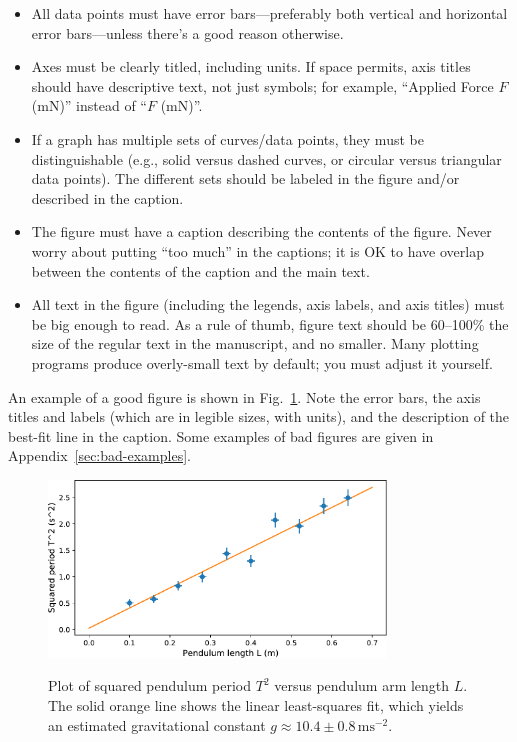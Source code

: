 \documentclass[11pt,a4paper]{article}
\begin{document}
\begin{itemize}
\item All data points must have error bars---preferably both vertical
  and horizontal error bars---unless there's a good reason otherwise.

\item Axes must be clearly titled, including units.  If space permits,
  axis titles should have descriptive text, not just symbols; for
  example, ``Applied Force $F$ (mN)'' instead of ``$F$ (mN)''.

\item If a graph has multiple sets of curves/data points, they must be
  distinguishable (e.g., solid versus dashed curves, or circular
  versus triangular data points).  The different sets should be
  labeled in the figure and/or described in the caption.

\item The figure must have a caption describing the contents of the
  figure.  Never worry about putting ``too much'' in the captions; it
  is OK to have overlap between the contents of the caption and the
  main text.

\item
  All text in the figure (including the legends, axis labels, and axis
  titles) must be big enough to read.  As a rule of thumb, figure text
  should be 60--100\% the size of the regular text in the manuscript,
  and no smaller.  Many plotting programs produce overly-small text by
  default; you must adjust it yourself.
\end{itemize}
\noindent
An example of a good figure is shown in Fig.~\ref{pendulum-figure-1}.
Note the error bars, the axis titles and labels (which are in legible
sizes, with units), and the description of the best-fit line in the
caption.  Some examples of bad figures are given in
Appendix~\ref{sec:bad-examples}.

\begin{figure}[h]
  \centering
  \includegraphics[width=0.8\textwidth]{pendulum-figure-1.pdf} \\
  \caption{\small Plot of squared pendulum period $T^2$ versus
    pendulum arm length $L$.  The solid orange line shows the linear
    least-squares fit, which yields an estimated gravitational
    constant $g \approx 10.4 \pm 0.8\,\textrm{ms}^{-2}$.}
  \label{pendulum-figure-1}
\end{figure}
\end{document}
